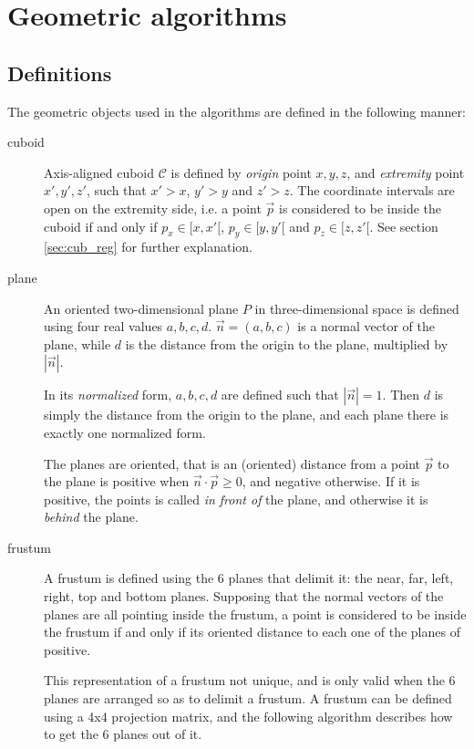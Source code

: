 \documentclass[a4paper,10pt,abstracton,notitlepage]{scrreprt}
\begin{document}
\appendix
\chapter{Geometric algorithms}

\section{Definitions}
The geometric objects used in the algorithms are defined in the following manner:
\begin{description}
\item[cuboid] Axis-aligned cuboid $\mathcal{C}$ is defined by \emph{origin} point $x, y, z$, and \emph{extremity} point $x', y', z'$, such that $x' > x$, $y' > y$ and $z' > z$. The coordinate intervals are open on the extremity side, i.e. a point $\overrightarrow{p}$ is considered to be inside the cuboid if and only if $p_{x} \in [x, x'[$, $p_{y} \in [y, y'[$ and $p_{z} \in [z, z'[$. See section \ref{sec:cub_reg} for further explanation.

\item[plane] An oriented two-dimensional plane $P$ in three-dimensional space is defined using four real values $a, b, c, d$. $\overrightarrow{n} = (a, b, c)$ is a normal vector of the plane, while $d$ is the distance from the origin to the plane, multiplied by $|\overrightarrow{n}|$.

In its \emph{normalized} form, $a, b, c, d$ are defined such that $|\overrightarrow{n}| = 1$. Then $d$ is simply the distance from the origin to the plane, and each plane there is exactly one normalized form.

The planes are oriented, that is an (oriented) distance from a point $\overrightarrow{p}$ to the plane is positive when $\overrightarrow{n} \cdot \overrightarrow{p} \geq 0$, and negative otherwise. If it is positive, the points is called \emph{in front of} the plane, and otherwise it is \emph{behind} the plane.

\item[frustum] A frustum is defined using the 6 planes that delimit it: the near, far, left, right, top and bottom planes. Supposing that the normal vectors of the planes are all pointing inside the frustum, a point is considered to be inside the frustum if and only if its oriented distance to each one of the planes of positive.

This representation of a frustum not unique, and is only valid when the 6 planes are arranged so as to delimit a frustum. A frustum can be defined using a 4x4 projection matrix, and the following algorithm describes how to get the 6 planes out of it.
\end{description}
\end{document}
